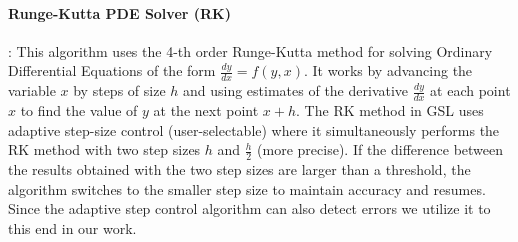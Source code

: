\documentclass{sig-alternate}
\begin{document}
\paragraph{Runge-Kutta PDE Solver (RK)}:
This algorithm uses the 4-th order Runge-Kutta method for solving Ordinary Differential Equations of the form $\frac{dy}{dx} = f(y, x)$.
It works by advancing the variable $x$ by steps of size $h$ and using estimates of the derivative $\frac{dy}{dx}$ at each point $x$ to find the value of $y$ at the next point $x+h$.
The RK method in GSL uses adaptive step-size control (user-selectable) where it simultaneously performs the RK method with two step sizes $h$ and $\frac{h}{2}$ (more precise).
If the difference between the results obtained with the two step sizes are larger than a threshold, the algorithm switches to the smaller step size to maintain accuracy and resumes.
Since the adaptive step control algorithm can also detect errors we utilize it to this end in our work.
\end{document}
